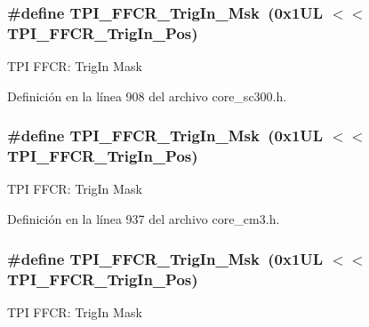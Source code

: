 \subsubsection[{\texorpdfstring{T\+P\+I\+\_\+\+F\+F\+C\+R\+\_\+\+Trig\+In\+\_\+\+Msk}{TPI_FFCR_TrigIn_Msk}}]{\setlength{\rightskip}{0pt plus 5cm}\#define T\+P\+I\+\_\+\+F\+F\+C\+R\+\_\+\+Trig\+In\+\_\+\+Msk~(0x1\+U\+L $<$$<$ T\+P\+I\+\_\+\+F\+F\+C\+R\+\_\+\+Trig\+In\+\_\+\+Pos)}\hypertarget{group___c_m_s_i_s___t_p_i_ga360b413bc5da61f751546a7133c3e4dd}{}\label{group___c_m_s_i_s___t_p_i_ga360b413bc5da61f751546a7133c3e4dd}
T\+PI F\+F\+CR\+: Trig\+In Mask 

Definición en la línea 908 del archivo core\+\_\+sc300.\+h.

\subsubsection[{\texorpdfstring{T\+P\+I\+\_\+\+F\+F\+C\+R\+\_\+\+Trig\+In\+\_\+\+Msk}{TPI_FFCR_TrigIn_Msk}}]{\setlength{\rightskip}{0pt plus 5cm}\#define T\+P\+I\+\_\+\+F\+F\+C\+R\+\_\+\+Trig\+In\+\_\+\+Msk~(0x1\+U\+L $<$$<$ T\+P\+I\+\_\+\+F\+F\+C\+R\+\_\+\+Trig\+In\+\_\+\+Pos)}\hypertarget{group___c_m_s_i_s___t_p_i_ga360b413bc5da61f751546a7133c3e4dd}{}\label{group___c_m_s_i_s___t_p_i_ga360b413bc5da61f751546a7133c3e4dd}
T\+PI F\+F\+CR\+: Trig\+In Mask 

Definición en la línea 937 del archivo core\+\_\+cm3.\+h.

\subsubsection[{\texorpdfstring{T\+P\+I\+\_\+\+F\+F\+C\+R\+\_\+\+Trig\+In\+\_\+\+Msk}{TPI_FFCR_TrigIn_Msk}}]{\setlength{\rightskip}{0pt plus 5cm}\#define T\+P\+I\+\_\+\+F\+F\+C\+R\+\_\+\+Trig\+In\+\_\+\+Msk~(0x1\+U\+L $<$$<$ T\+P\+I\+\_\+\+F\+F\+C\+R\+\_\+\+Trig\+In\+\_\+\+Pos)}\hypertarget{group___c_m_s_i_s___t_p_i_ga360b413bc5da61f751546a7133c3e4dd}{}\label{group___c_m_s_i_s___t_p_i_ga360b413bc5da61f751546a7133c3e4dd}
T\+PI F\+F\+CR\+: Trig\+In Mask 

